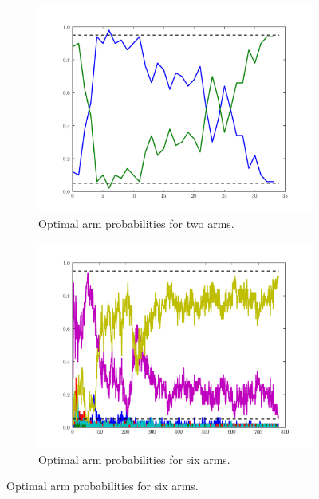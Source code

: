 \begin{figure}
\centering
\begin{subfigure}[t]{.49\textwidth}
\centering
\includegraphics[width=\textwidth]{weights1.pdf}
\caption{Optimal arm probabilities for two arms.}
\label{fig:weights1}
\end{subfigure}
\begin{subfigure}[t]{.49\textwidth}
\centering
\includegraphics[width=\textwidth]{weights2.pdf}
\caption{Optimal arm probabilities for six arms.}
\label{fig:weights2}
\end{subfigure}
\end{figure}



